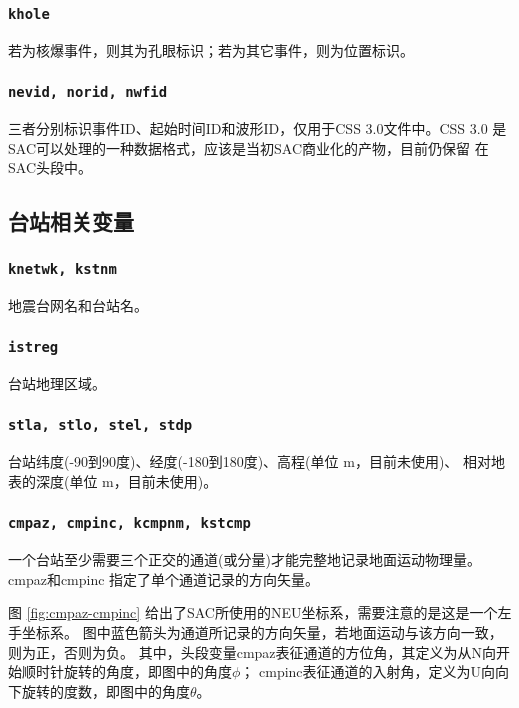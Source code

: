 \subsubsection{\texttt{khole}}
若为核爆事件，则其为孔眼标识；若为其它事件，则为位置标识。

\subsubsection{\texttt{nevid, norid, nwfid}}
三者分别标识事件ID、起始时间ID和波形ID，仅用于CSS 3.0文件中。CSS 3.0
是SAC可以处理的一种数据格式，应该是当初SAC商业化的产物，目前仍保留
在SAC头段中。

\subsection{台站相关变量}
\subsubsection{\texttt{knetwk, kstnm}}
地震台网名和台站名。

\subsubsection{\texttt{istreg}\dag}
台站地理区域。

\subsubsection{\texttt{stla, stlo, stel, stdp}}
台站纬度(-90到90度)、经度(-180到180度)、高程(单位 \si{m}，目前未使用)、
相对地表的深度(单位 \si{m}，目前未使用)。

\subsubsection{\texttt{cmpaz, cmpinc, kcmpnm, kstcmp}}
一个台站至少需要三个正交的通道(或分量)才能完整地记录地面运动物理量。cmpaz和cmpinc
指定了单个通道记录的方向矢量。

图 \ref{fig:cmpaz-cmpinc} 给出了SAC所使用的NEU坐标系，需要注意的是这是一个左手坐标系。
图中蓝色箭头为通道所记录的方向矢量，若地面运动与该方向一致，则为正，否则为负。
其中，头段变量cmpaz表征通道的方位角，其定义为从N向开始顺时针旋转的角度，即图中的角度$\phi$；
cmpinc表征通道的入射角，定义为U向向下旋转的度数，即图中的角度$\theta$。

